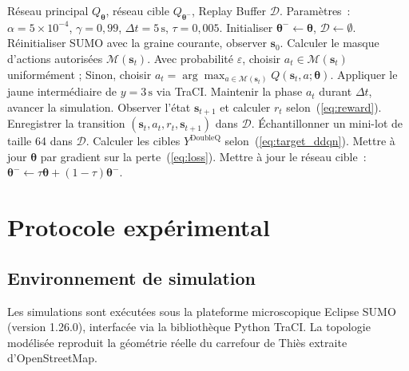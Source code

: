 \documentclass[10pt,twocolumn,letterpaper]{article}
\begin{document}
\begin{algorithm}[t]
\caption{Contrôle adaptatif par Double DQN sous contraintes}
\label{alg:double_dqn}
\begin{algorithmic}[1]
\REQUIRE Réseau principal $Q_{\boldsymbol{\theta}}$, réseau cible $Q_{\boldsymbol{\theta}^-}$, Replay Buffer $\mathcal{D}$.
\REQUIRE Paramètres~: $\alpha = 5 \times 10^{-4}$, $\gamma = 0{,}99$, $\Delta t = 5\,\mathrm{s}$, $\tau = 0{,}005$.
\STATE Initialiser $\boldsymbol{\theta}^- \leftarrow \boldsymbol{\theta}$, $\mathcal{D} \leftarrow \emptyset$.
    \STATE Réinitialiser SUMO avec la graine courante, observer $\mathbf{s}_0$.
        \STATE Calculer le masque d'actions autorisées $\mathcal{M}(\mathbf{s}_t)$.
        \STATE Avec probabilité $\varepsilon$, choisir $a_t \in \mathcal{M}(\mathbf{s}_t)$ uniformément ;
        \STATE Sinon, choisir $a_t = \arg\max_{a \in \mathcal{M}(\mathbf{s}_t)} Q(\mathbf{s}_t, a; \boldsymbol{\theta})$.
            \STATE Appliquer le jaune intermédiaire de $y = 3\,\mathrm{s}$ via TraCI.
        \ENDIF
        \STATE Maintenir la phase $a_t$ durant $\Delta t$, avancer la simulation.
        \STATE Observer l'état $\mathbf{s}_{t+1}$ et calculer $r_t$ selon~(\ref{eq:reward}).
        \STATE Enregistrer la transition $(\mathbf{s}_t, a_t, r_t, \mathbf{s}_{t+1})$ dans $\mathcal{D}$.
        \STATE Échantillonner un mini-lot de taille 64 dans $\mathcal{D}$.
        \STATE Calculer les cibles $Y^{\text{DoubleQ}}$ selon~(\ref{eq:target_ddqn}).
        \STATE Mettre à jour $\boldsymbol{\theta}$ par gradient sur la perte~(\ref{eq:loss}).
        \STATE Mettre à jour le réseau cible~: $\boldsymbol{\theta}^- \leftarrow \tau \boldsymbol{\theta} + (1 - \tau) \boldsymbol{\theta}^-$.
    \ENDFOR
\ENDFOR
\end{algorithmic}
\end{algorithm}

\section{Protocole expérimental}
\label{sec:setup}

\subsection{Environnement de simulation}
Les simulations sont exécutées sous la plateforme microscopique Eclipse SUMO (version 1.26.0), interfacée via la bibliothèque Python TraCI. La topologie modélisée reproduit la géométrie réelle du carrefour de Thiès extraite d'OpenStreetMap.
\end{document}
